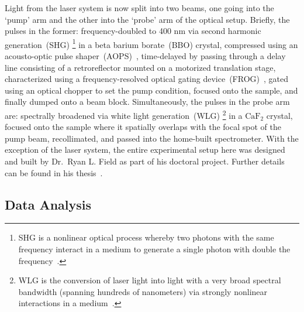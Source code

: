 Light from the laser system is now split into two beams, one going into the `pump' arm
and the other into the `probe' arm of the optical setup. Briefly, the pulses in the former:
frequency-doubled to 400 nm via second harmonic generation~(SHG)%
\footnote{SHG is a nonlinear optical process whereby two photons with the same frequency interact in
a medium to generate a single photon with double the frequency~\cite{BoydBook}.}
in a beta barium borate~(BBO) crystal, compressed using an acousto-optic pulse shaper~(AOPS)~\cite{Dugan1997},
time-delayed by passing through a delay line consisting of a retroreflector mounted on a motorized
translation stage, characterized using a frequency-resolved optical gating device~(FROG)~\cite{Trebino2000},
gated using an optical chopper to set the pump condition, focused onto the sample,
and finally dumped onto a beam block.
%
Simultaneously, the pulses in the probe arm are:
spectrally broadened via white light generation~(WLG)%
\footnote{WLG is the conversion of laser light into light with a very broad spectral bandwidth
(spanning hundreds of nanometers) via strongly nonlinear interactions
in a medium~\cite{Alfano1970, Nagura2002}.}
in a \(\mathrm{CaF_2}\) crystal,
focused onto the sample where it spatially overlaps with the focal spot of the pump beam,
recollimated, and passed into the home-built spectrometer.
%
With the exception of the laser system, the entire experimental setup here
was designed and built by Dr.~Ryan L. Field as part of his doctoral project.
Further details can be found in his thesis~\cite{Ryan-thesis}.

\subsection{Data Analysis}
\label{sec: TA-data-analysis}

